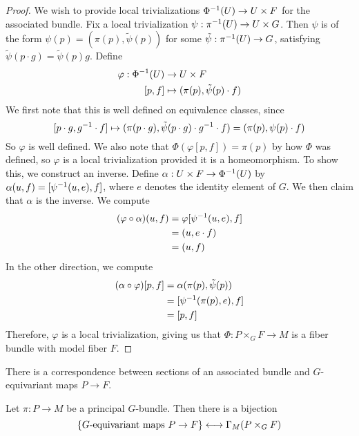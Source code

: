 \begin{proof}
We wish to provide local trivializations  $\Phi^{-1}(U) \to U \times F$ for the
associated bundle. Fix a local trivialization  $\psi : \pi^{-1}(U) \to U \times G$.
Then $\psi$ is of the form $\psi(p) = (\pi(p), \tilde{\psi}(p))$ for some
$\tilde{\psi} : \pi^{-1}(U) \to G$, satisfying $\tilde{\psi}(p\cdot g) = \tilde{\psi}(p)g$.
Define
\begin{align*}
\varphi : \Phi^{-1}(U) &\to U \times F \\
[p,f] &\mapsto (\pi(p), \tilde{\psi}(p)\cdot f)
\end{align*}
We first note that this is well defined on equivalence classes, since
\[
[p\cdot g, g^{-1} \cdot f] \mapsto (\pi(p \cdot g), \tilde{\psi}(p \cdot g)
\cdot g^{-1} \cdot f)
= (\pi(p), \psi(p)\cdot f)
\]
So $\varphi$ is well defined. We also note that $\Phi(\varphi[p,f]) = \pi(p)$
by how $\Phi$ was defined, so $\varphi$ is a local trivialization provided
it is a homeomorphism. To show this, we construct an inverse.
Define $\alpha : U \times F \to \Phi^{-1}(U)$
by $\alpha(u,f) = [\psi^{-1}(u,e), f]$, where $e$ denotes the identity element
of $G$. We then claim that $\alpha$ is the inverse. We compute
%
\begin{align*}
(\varphi \circ \alpha)(u,f) &= \varphi[\psi^{-1}(u,e),f] \\
&= (u, e\cdot f)\\
&= (u,f)
\end{align*}
%
In the other direction, we compute
%
\begin{align*}
(\alpha \circ \varphi)[p,f] &= \alpha(\pi(p), \tilde{\psi}(p)) \\
&= [\psi^{-1}(\pi(p), e), f] \\
&= [p, f]
\end{align*}
%
Therefore, $\varphi$ is a local trivialization, giving us that
$\Phi: P \times_G F \to M$ is a fiber bundle with model fiber $F$.
%
\end{proof}
%
There is a correspondence between sections of an associated bundle and
$G$-equivariant maps $P \to F$.
%
\begin{prop}
Let $\pi : P \to M$ be a principal $G$-bundle. Then there is a bijection
\[
\left\lbrace G\text{-equivariant maps } P \to F \right\rbrace \longleftrightarrow \Gamma_M(P \times_G F)
\]
\end{prop}
%
